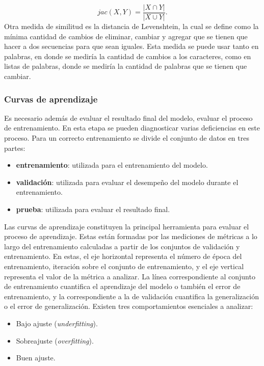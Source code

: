\documentclass[a4paper,11pt,twocolumn,twoside]{article}
\begin{document}
\begin{equation}
	jac(X, Y) = \frac{|X \cap Y|}{|X \cup Y|}.
\end{equation}
Otra medida de similitud es la distancia de Levenshtein, la cual se define como la mínima cantidad 
de cambios de eliminar, cambiar y agregar que se tienen que hacer a dos secuencias para que sean 
iguales. Esta medida se puede usar tanto en palabras, en donde se mediría la cantidad de cambios 
a los caracteres, como en listas de palabras, donde se mediría la cantidad de palabras que 
se tienen que cambiar. 

\subsubsection{Curvas de aprendizaje}

Es necesario además de evaluar el resultado final del modelo, evaluar el proceso de entrenamiento. En esta etapa 
se pueden diagnosticar varias deficiencias en este proceso. Para un correcto entrenamiento se divide el conjunto de 
datos en tres partes:

\begin{itemize}
	\item \textbf{entrenamiento}: utilizada para el entrenamiento del modelo.
	\item \textbf{validación}: utilizada para evaluar el desempeño del modelo durante el entrenamiento.
	\item \textbf{prueba}: utilizada para evaluar el resultado final.
\end{itemize}

Las curvas de aprendizaje constituyen la principal herramienta para evaluar el proceso de aprendizaje.
Estas están formadas por las mediciones de métricas a lo largo del entrenamiento calculadas a partir de 
los conjuntos de validación y entrenamiento. En estas, el eje horizontal representa el número de época del entrenamiento,
iteración sobre el conjunto de entrenamiento, y el eje vertical representa el valor de la métrica a analizar. 
La línea correspondiente al conjunto de entrenamiento cuantifica 
el aprendizaje del modelo o también el error de entrenamiento, y la correspondiente a la de validación cuantifica 
la generalización o el error de generalización. Existen tres comportamientos esenciales a analizar:

\begin{itemize}
	\item Bajo ajuste (\textit{underfitting}).
	\item Sobreajuste (\textit{overfitting}).
	\item Buen ajuste.
\end{itemize}
\end{document}
